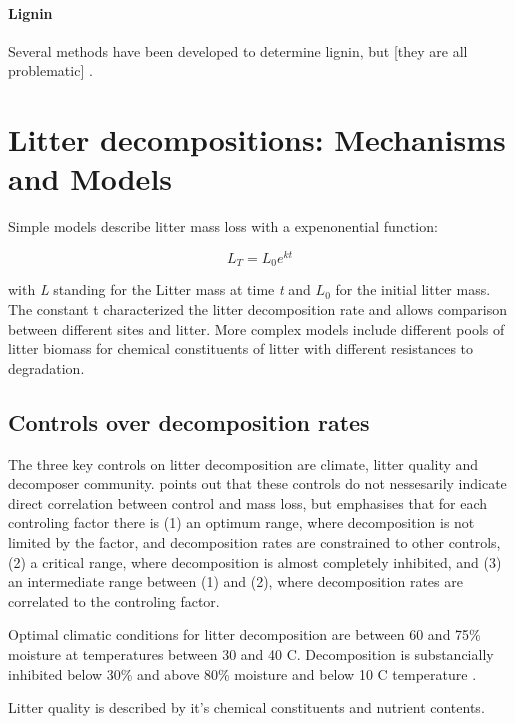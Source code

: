 \paragraph{Lignin}
Several methods have been developed to determine lignin, but [they are all problematic] \citep{Hatfield2005}.


\section{Litter decompositions: Mechanisms and Models}
Simple models describe litter mass loss with a expenonential function:

\begin{equation}
L_T=L_0e^{kt}
\end{equation}

with \emph{L} standing for the Litter mass at time \emph{t} and $L_0$ for the initial litter mass. The constant t characterized the litter decomposition rate \citep[p.157]{Chapin2002} and allows comparison between different sites and litter. More complex models include different pools of litter biomass for chemical constituents of litter with different resistances to degradation. 

\subsection{Controls over decomposition rates}
\label{decomp_controls}

The three key controls on litter decomposition are climate, litter quality and decomposer community. \cite{Prescott2010} points out that these controls do not nessesarily indicate direct correlation between control and mass loss, but emphasises that for each controling factor there is (1) an optimum range, where decomposition is not limited by the factor, and decomposition rates are constrained to other controls, (2) a critical range, where decomposition is almost completely inhibited, and (3) an intermediate range between (1) and (2), where decomposition rates are correlated to the controling factor. 

Optimal climatic conditions for litter decomposition are between 60 and 75\% moisture at temperatures between 30 and 40 \textdegree C. Decomposition is substancially inhibited below 30\% and above 80\% moisture and below 10 \textdegree C temperature \citep{Prescott2010}. 

Litter quality is described by it's chemical constituents and nutrient contents. 


